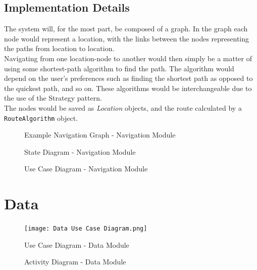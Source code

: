 \documentclass[english]{article}
\begin{document}
        \subsection{Implementation Details}
            The system will, for the most part, be composed of a graph. In the graph each node would represent a location, with the links between the nodes representing the paths from location to location. \\
            Navigating from one location-node to another would then simply be a matter of using some shortest-path algorithm to find the path. The algorithm would depend on the user's preferences such as finding the shortest path as opposed to the quickest path, and so on. These algorithms would be interchangeable due to the use of the Strategy pattern. \\
            The nodes would be saved as \textit{Location} objects, and the route calculated by a \texttt{RouteAlgorithm} object.

        \begin{figure}[H]
            \centering	            \centerline{}
            \caption{Example Navigation Graph - Navigation Module}
        \end{figure}

        \begin{figure}[H]
            \centering	            \centerline{}
            \caption{State Diagram - Navigation Module}
        \end{figure}

        \begin{figure}[H]
            \centering	            \centerline{}
            \caption{Use Case Diagram - Navigation Module}
        \end{figure}

    \section{Data}
        \begin{figure}[H]
            \centering	            \centerline{\texttt{[image: Data Use Case Diagram.png]}}
            \caption{Use Case Diagram - Data Module}
        \end{figure}

        \begin{figure}[H]
            \centering	            \centerline{}
            \caption{Activity Diagram - Data Module}
        \end{figure}
\end{document}
